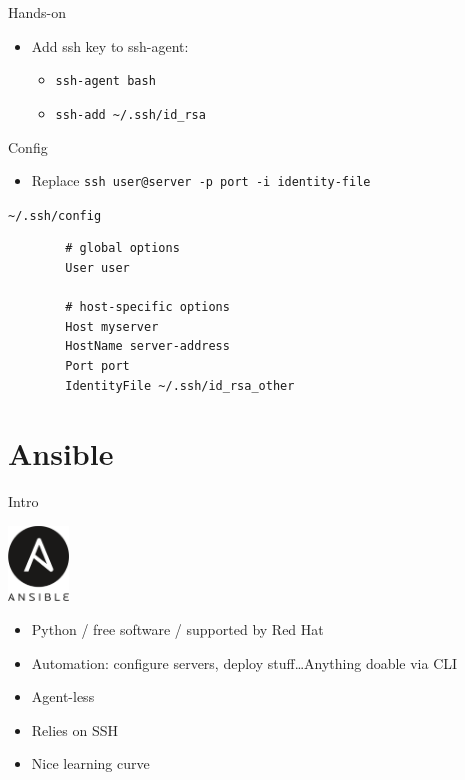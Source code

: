 \documentclass{beamer}
\begin{document}
\begin{frame}{Hands-on}
  \begin{itemize}
    \item Add ssh key to ssh-agent:
      \begin{itemize}
        \item {\tt ssh-agent bash}
        \item {\tt ssh-add \textasciitilde/.ssh/id\_rsa}
      \end{itemize}
  \end{itemize}
\end{frame}

\begin{frame}[fragile]{Config}
  \begin{itemize}
    \item Replace {\tt ssh user@server -p port -i identity-file}
  \end{itemize}
  \begin{exampleblock}{\tt \textasciitilde/.ssh/config} {
      \begin{verbatim}
        # global options
        User user

        # host-specific options
        Host myserver
        HostName server-address
        Port port
        IdentityFile ~/.ssh/id_rsa_other
      \end{verbatim}
    }
  \end{exampleblock}
\end{frame}

\section{Ansible}
\begin{frame}{Intro}
  \begin{center}
    \includegraphics[height=2cm]{images/ansible_logo.png}
  \end{center}
  \begin{itemize}
    \item Python / free software / supported by Red Hat
    \item Automation: configure servers, deploy stuff\ldots Anything doable
      via CLI
    \item Agent-less
    \item Relies on SSH
    \item Nice learning curve
  \end{itemize}
\end{frame}
\end{document}
